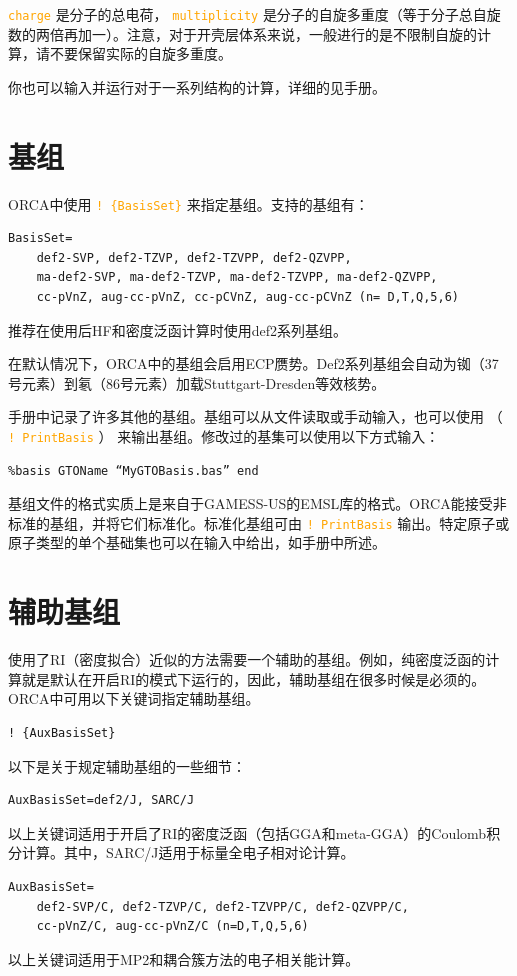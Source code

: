 \documentclass{ctexart}
\newcommand{\cmd}[1]{\textcolor{orange}{ \texttt{#1} }}
\begin{document}
	\cmd{charge}是分子的总电荷，\cmd{multiplicity}是分子的自旋多重度（等于分子总自旋数的两倍再加一）。注意，对于开壳层体系来说，一般进行的是不限制自旋的计算，请不要保留实际的自旋多重度。
	
	你也可以输入并运行对于一系列结构的计算，详细的见手册。
	
	\section{基组}
	ORCA中使用\cmd{! \{BasisSet\}}来指定基组。支持的基组有：
	\begin{lstlisting}
BasisSet= 
	def2-SVP, def2-TZVP, def2-TZVPP, def2-QZVPP,
	ma-def2-SVP, ma-def2-TZVP, ma-def2-TZVPP, ma-def2-QZVPP,
	cc-pVnZ, aug-cc-pVnZ, cc-pCVnZ, aug-cc-pCVnZ (n= D,T,Q,5,6)
	\end{lstlisting}
	
	推荐在使用后HF和密度泛函计算时使用def2系列基组。
	
	在默认情况下，ORCA中的基组会启用ECP赝势。Def2系列基组会自动为铷（37号元素）到氡（86号元素）加载Stuttgart-Dresden等效核势。
	
	手册中记录了许多其他的基组。基组可以从文件读取或手动输入，也可以使用 （\cmd{! PrintBasis}） 来输出基组。修改过的基集可以使用以下方式输入：
	\begin{lstlisting}
%basis GTOName “MyGTOBasis.bas” end
	\end{lstlisting}
	
	基组文件的格式实质上是来自于GAMESS-US的EMSL库的格式。ORCA能接受非标准的基组，并将它们标准化。标准化基组可由\cmd{! PrintBasis}输出。特定原子或原子类型的单个基础集也可以在输入中给出，如手册中所述。
	
	\section{辅助基组}
	使用了RI（密度拟合）近似的方法需要一个辅助的基组。例如，纯密度泛函的计算就是默认在开启RI的模式下运行的，因此，辅助基组在很多时候是必须的。ORCA中可用以下关键词指定辅助基组。
	\begin{lstlisting}
! {AuxBasisSet}
	\end{lstlisting}
	
	以下是关于规定辅助基组的一些细节：
	
	\begin{lstlisting}
AuxBasisSet=def2/J, SARC/J
	\end{lstlisting}
	以上关键词适用于开启了RI的密度泛函（包括GGA和meta-GGA）的Coulomb积分计算。其中，SARC/J适用于标量全电子相对论计算。
	\begin{lstlisting}
AuxBasisSet= 
	def2-SVP/C, def2-TZVP/C, def2-TZVPP/C, def2-QZVPP/C, 
	cc-pVnZ/C, aug-cc-pVnZ/C (n=D,T,Q,5,6)
	\end{lstlisting}
	以上关键词适用于MP2和耦合簇方法的电子相关能计算。
	
\end{document}
